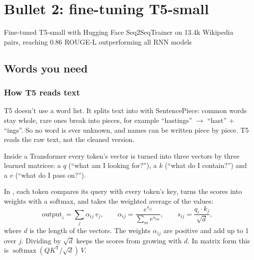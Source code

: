 \chapter{Bullet 2: fine-tuning T5-small}
\label{ch:t5}

\begin{cvline}
Fine-tuned T5-small with Hugging Face Seq2SeqTrainer on 13.4k Wikipedia pairs, reaching 0.86 ROUGE-L outperforming all RNN models
\end{cvline}

\section{Words you need}

\subsection*{How T5 reads text}

\begin{definition}
T5 doesn't use a word list. It splits text into  with SentencePiece: common words stay whole, rare ones break into pieces, for example ``hastings'' $\to$ ``hast'' + ``ings''. So no word is ever unknown, and names can be written piece by piece. T5 reads the raw text, not the cleaned version.
\end{definition}

\begin{definition}
Inside a Transformer every token's vector is turned into three vectors by three learned matrices: a  $q$ (``what am I looking for?''), a  $k$ (``what do I contain?'') and a  $v$ (``what do I pass on?'').
\end{definition}

\begin{definition}
In , each token compares its query with every token's key, turns the scores into weights with a softmax, and takes the weighted average of the values:
\[
\text{output}_i = \sum_j \alpha_{ij}\, v_j, \qquad \alpha_{ij} = \frac{e^{s_{ij}}}{\sum_m e^{s_{im}}}, \qquad s_{ij} = \frac{q_i \cdot k_j}{\sqrt{d}} ,
\]
where $d$ is the length of the vectors. The weights $\alpha_{ij}$ are positive and add up to 1 over $j$. Dividing by $\sqrt{d}$ keeps the scores from growing with $d$. In matrix form this is $\operatorname{softmax}(QK^{\mathsf{T}}/\sqrt{d})\,V$.
\end{definition}

